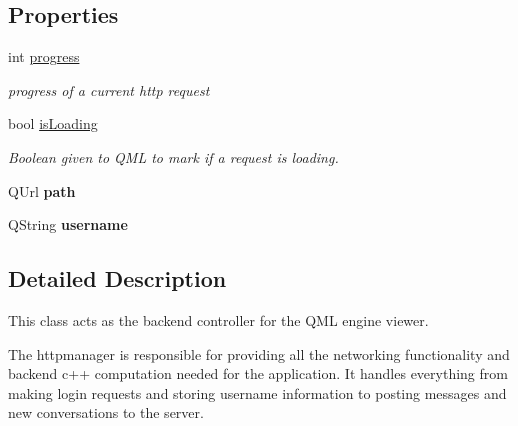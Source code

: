 \subsection*{Properties}
\begin{DoxyCompactItemize}
\item 
\hypertarget{classHttpManager_a090619732438afb63e0605bc1bb2d33f}{int \hyperlink{classHttpManager_a090619732438afb63e0605bc1bb2d33f}{progress}}\label{classHttpManager_a090619732438afb63e0605bc1bb2d33f}

\begin{DoxyCompactList}\small\item\em progress of a current http request \end{DoxyCompactList}\item 
bool \hyperlink{classHttpManager_aa2f331facd6aeaff68c6f424f10bbce5}{is\-Loading}
\begin{DoxyCompactList}\small\item\em Boolean given to Q\-M\-L to mark if a request is loading. \end{DoxyCompactList}\item 
\hypertarget{classHttpManager_aa32509947efe9fbdfd54b88516969af8}{Q\-Url {\bfseries path}}\label{classHttpManager_aa32509947efe9fbdfd54b88516969af8}

\item 
\hypertarget{classHttpManager_a7d7b4a614a7e7a7950710e16e3790638}{Q\-String {\bfseries username}}\label{classHttpManager_a7d7b4a614a7e7a7950710e16e3790638}

\end{DoxyCompactItemize}


\subsection{Detailed Description}
This class acts as the backend controller for the Q\-M\-L engine viewer. 

The httpmanager is responsible for providing all the networking functionality and backend c++ computation needed for the application. It handles everything from making login requests and storing username information to posting messages and new conversations to the server. 

